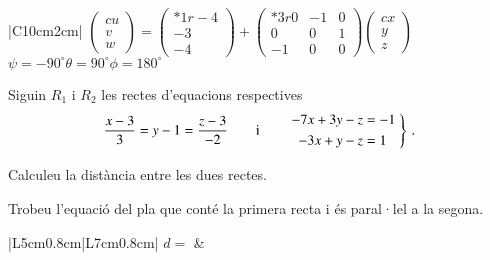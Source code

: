 \documentclass[10pt,catalan]{article}
\begin{document}
\begin{solucio}
\begin{center}
\begin{tabular}{|C{10cm}{2cm}|}
\hline
$\begin{pmatrix}{c} u \\ v \\ w\end{pmatrix} = 
\begin{pmatrix}{*{1}r} -4\\ -3\\ -4\end{pmatrix} + 
\begin{pmatrix}{*{3}r} 0 & -1 & 0\\ 0 & 0 & 1\\ -1 & 0 & 0\end{pmatrix}
\begin{pmatrix}{c} x \\ y \\ z\end{pmatrix}$ \\
\hline
{}
{$\psi=-90^\circ$\hspace{1.7cm}$\theta=90^\circ$\hspace{1.7cm}$\phi=180^\circ$} \\
\hline
\end{tabular}
\end{center}
\end{solucio}





\begin{enunciat}
Siguin $R_1$ i $R_2$ les rectes d'equacions respectives
\[
  \frac{x - 3}{3} = y - 1 = \frac{z - 3}{-2}\qquad\text{i}\qquad \left.\aligned - 7 x + 3 y - z &= -1 \\ - 3 x + y - z &= 1 \endaligned\;\right\}\,.
\]
\begin{apartats}
\item Calculeu la distància entre les dues rectes.
\item Trobeu l'equació del pla que conté la primera recta i és paral·lel a la segona. 
\end{apartats}
\end{enunciat}

\begin{quadricula}
\begin{tabular}{|L{5cm}{0.8cm}|L{7cm}{0.8cm}|}
\hline
$d=$ & \\ 
\hline
\end{tabular}
\end{quadricula}
\end{document}
